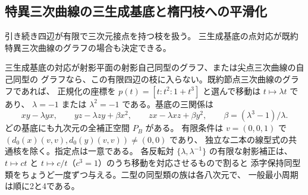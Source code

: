 \subsection{特異三次曲線の三生成基底と楕円枝への平滑化}
\label{sec:singular-tangent-smoothing}
引き続き四辺が有限で三次元接点を持つ枝を扱う。
三生成基底の点対応が既約特異三次曲線のグラフの場合も決定できる。

\begin{theorem}\label{thm:nodal-tangent-windows}
三生成基底の対応が射影平面の射影自己同型のグラフ、または尖点三次曲線の自己同型の
グラフなら、この有限四辺の枝に入らない。既約節点三次曲線のグラフであれば、
正規化の座標を $p(t)=[t:t^2:1+t^3]$ と選んで移動は $t\mapsto\lambda t$ であり、
$\lambda=-1$ または $\lambda^2=-1$ である。基底の三関係は
\[
 xy-\lambda yx,\qquad yz-\lambda zy+\beta x^2,\qquad
 zx-\lambda xz+\beta y^2,\qquad \beta=(\lambda^3-1)/\lambda .
\]
どの基底にも九次元の全補正空間 $P_B$ がある。
有限条件は $v=(0,0,1)$ で $(d_0(x)(v,v),d_0(y)(v,v))\ne(0,0)$ であり、
独立な二本の線型式の共通核を除く。指定点は一意である。
各反転対 $\{\lambda,\lambda^{-1}\}$ の有限な射影補正は、
$t\mapsto ct$ と $t\mapsto c/t$（$c^3=1$）のうち移動を対応させるもので割ると
添字保持同型類をちょうど一度ずつ与える。二型の同型類の族は各八次元で、
一般最小周期は順に2と4である。
\end{theorem}
